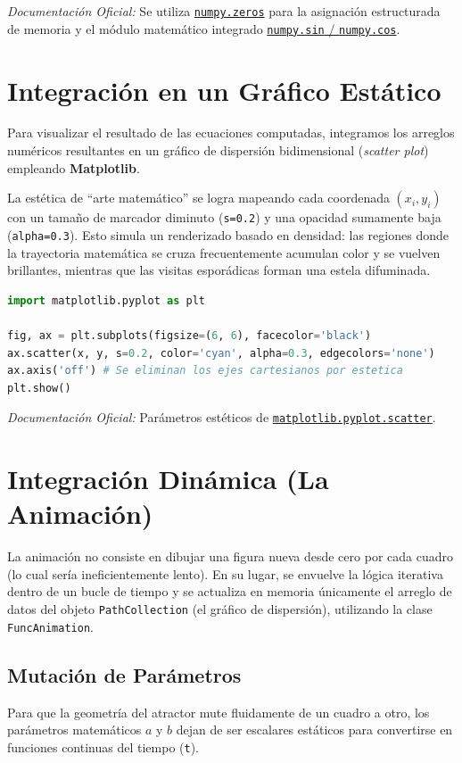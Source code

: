 \documentclass[12pt, a4paper]{article}
\begin{document}
\textit{Documentación Oficial:} Se utiliza \href{https://numpy.org/doc/stable/reference/generated/numpy.zeros.html}{\texttt{numpy.zeros}} para la asignación estructurada de memoria y el módulo matemático integrado \href{https://numpy.org/doc/stable/reference/routines.math.html}{\texttt{numpy.sin} / \texttt{numpy.cos}}.

\section{Integración en un Gráfico Estático}
Para visualizar el resultado de las ecuaciones computadas, integramos los arreglos numéricos resultantes en un gráfico de dispersión bidimensional (\textit{scatter plot}) empleando \textbf{Matplotlib}.

La estética de ``arte matemático'' se logra mapeando cada coordenada $(x_i, y_i)$ con un tamaño de marcador diminuto (\texttt{s=0.2}) y una opacidad sumamente baja (\texttt{alpha=0.3}). Esto simula un renderizado basado en densidad: las regiones donde la trayectoria matemática se cruza frecuentemente acumulan color y se vuelven brillantes, mientras que las visitas esporádicas forman una estela difuminada.

\begin{lstlisting}[language=Python]
import matplotlib.pyplot as plt

fig, ax = plt.subplots(figsize=(6, 6), facecolor='black')
ax.scatter(x, y, s=0.2, color='cyan', alpha=0.3, edgecolors='none')
ax.axis('off') # Se eliminan los ejes cartesianos por estetica
plt.show()
\end{lstlisting}

\textit{Documentación Oficial:} Parámetros estéticos de \href{https://matplotlib.org/stable/api/_as_gen/matplotlib.pyplot.scatter.html}{\texttt{matplotlib.pyplot.scatter}}.

\section{Integración Dinámica (La Animación)}
La animación no consiste en dibujar una figura nueva desde cero por cada cuadro (lo cual sería ineficientemente lento). En su lugar, se envuelve la lógica iterativa dentro de un bucle de tiempo y se actualiza en memoria únicamente el arreglo de datos del objeto \texttt{PathCollection} (el gráfico de dispersión), utilizando la clase \texttt{FuncAnimation}.

\subsection{Mutación de Parámetros}
Para que la geometría del atractor mute fluidamente de un cuadro a otro, los parámetros matemáticos $a$ y $b$ dejan de ser escalares estáticos para convertirse en funciones continuas del tiempo (\texttt{t}). 
\end{document}
